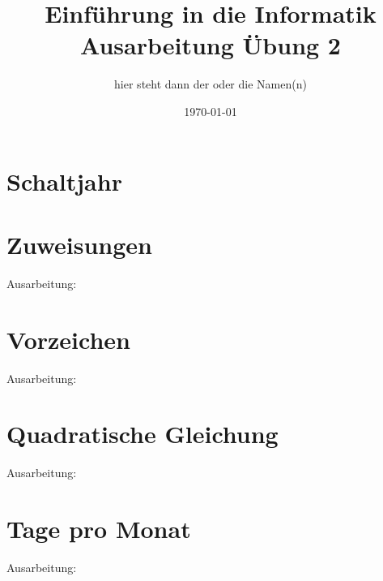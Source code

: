 \documentclass[a4paper,11pt,titlepage]{article}
\begin{document}
\title{Einf\"uhrung in die Informatik\\
Ausarbeitung \"Ubung 2}


\author{hier steht dann der oder die Namen(n)}


\date{\today}

\maketitle{\thispagestyle{plain}}

\section{Schaltjahr}

\section{Zuweisungen}
Ausarbeitung:
\newpage
\section{Vorzeichen}
Ausarbeitung:
\newpage
\section{Quadratische Gleichung}
Ausarbeitung:
\newpage
\section{Tage pro Monat}
Ausarbeitung:
\newpage
\end{document}
